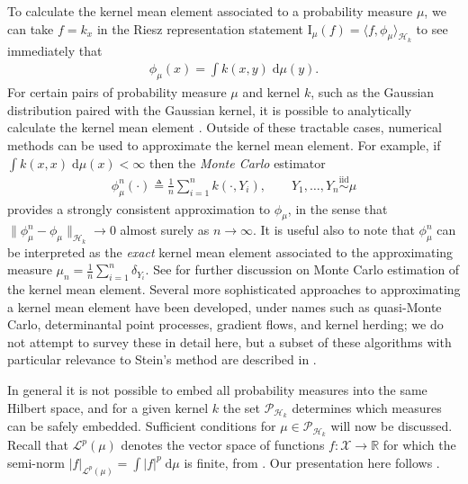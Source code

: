 \documentclass[12pt,paper=letter]{scrreprt}
\def\defeq{\triangleq} %
\begin{document}
To calculate the kernel mean element associated to a probability measure $\mu$, we can take $f = k_x$ in the Riesz representation statement $\mathrm{I}_\mu(f) = \langle f , \phi_\mu \rangle_{\mathcal{H}_k}$ to see immediately that 
\begin{align}
    \phi_\mu(x) = \int k(x,y) \; \mathrm{d}\mu(y).  \label{eq: kernel mean element}
\end{align}
For certain pairs of probability measure $\mu$ and kernel $k$, such as the Gaussian distribution paired with the Gaussian kernel, it is possible to analytically calculate the kernel mean element \citep{briol2025dictionary}.
Outside of these tractable cases, numerical methods can be used to approximate the kernel mean element.
For example, if $\int k(x,x) \; \mathrm{d}\mu(x) < \infty$ then the \emph{Monte Carlo} estimator
\begin{align}
    \phi_\mu^n(\cdot) \defeq  \frac{1}{n} \sum_{i=1}^n k(\cdot, Y_i), \qquad Y_1,\dots,Y_n \stackrel{\mathrm{iid}}{\sim} \mu \label{eq: approx kernel mean}
\end{align}
provides a strongly consistent approximation to $\phi_\mu$, in the sense that $\|\phi_\mu^n - \phi_\mu\|_{\mathcal{H}_k} \rightarrow 0$ almost surely as $n \rightarrow \infty$.
It is useful also to note that $\phi_\mu^n$ can be interpreted as the \emph{exact} kernel mean element associated to the approximating measure $\mu_n = \frac{1}{n} \sum_{i=1}^n \delta_{Y_i}$.
See  for further discussion on Monte Carlo estimation of the kernel mean element.
Several more sophisticated approaches to approximating a kernel mean element have been developed, under names such as quasi-Monte Carlo, determinantal point processes, gradient flows, and kernel herding; we do not attempt to survey these in detail here, but a subset of these algorithms with particular relevance to Stein's method are described in .

In general it is not possible to embed all probability measures into the same Hilbert space, and for a given kernel $k$ the set $\mathcal{P}_{\mathcal{H}_k}$ determines which measures can be safely embedded.
Sufficient conditions for $\mu \in \mathcal{P}_{\mathcal{H}_k}$ will now be discussed.
Recall that $\mathcal{L}^p(\mu)$ denotes the vector space of functions $f : \mathcal{X} \rightarrow \mathbb{R}$ for which the semi-norm $|f|_{\mathcal{L}^p(\mu)} = \int |f|^p \; \mathrm{d}\mu$ is finite, from .
Our presentation here follows \citet[][Appendix C]{barp2022targeted}.
\end{document}
